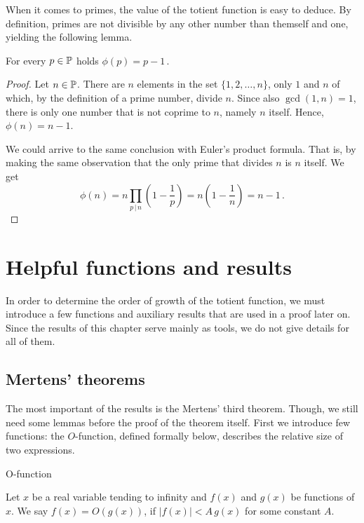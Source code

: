\documentclass{article}
\begin{document}
When it comes to primes, the value of the totient function is easy to deduce. By definition, primes are not divisible by any other number than themself and one, yielding the following lemma.

\begin{lemma}
\label{thm:phiprime}
For every $p \in \mathbb{P}$ holds $\phi(p) = p-1$\,.

\begin{proof}

Let $n\in\mathbb{P}$. There are $n$ elements in the set $\{1,2,\dots,n\}$, only $1$ and $n$ of which, by the definition of a prime number, divide $n$. Since also $\gcd(1,n)=1$, there is only one number that is not coprime to $n$, namely $n$ itself. Hence, $\phi(n)=n-1$.

We could arrive to the same conclusion with Euler's product formula. That is, by making the same observation that the only prime that divides $n$ is $n$ itself. We get
\begin{equation*}
    \phi(n) = n \prod_{p \,\vert\, n} \left(1 - \frac{1}{p}\right) = n\left(1-\frac{1}{n}\right) = n-1\,.
\end{equation*}

\end{proof}

\end{lemma}

\section{Helpful functions and results}
\label{apujutut}

In order to determine the order of growth of the totient function, we must introduce a few functions and auxiliary results that are used in a proof later on. Since the results of this chapter serve mainly as tools, we do not give details for all of them.

\subsection{Mertens' theorems}

The most important of the results is the Mertens' third theorem. Though, we still need some lemmas before the proof of the theorem itself. First we introduce few functions: the $O$-function, defined formally below, describes the relative size of two expressions.

\begin{definition}
O-function

Let $x$ be a real variable tending to infinity and $f(x)$ and $g(x)$ be functions of $x$. We say $f(x)=O(g(x))$, if $\vert f(x) \vert < A\,g(x)$ for some constant $A$.
\end{definition}
\end{document}
